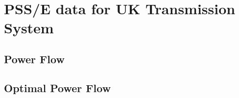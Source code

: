 %
%
%

\chapter{PSS/E data for UK Transmission System}
\section{Power Flow}
\label{sec:nget_pf}

\section{Optimal Power Flow}
\label{sec:nget_opf}
